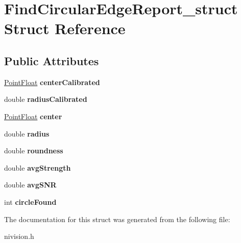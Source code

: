 \hypertarget{structFindCircularEdgeReport__struct}{
\section{FindCircularEdgeReport\_\-struct Struct Reference}
\label{structFindCircularEdgeReport__struct}
}
\subsection*{Public Attributes}
\begin{DoxyCompactItemize}
\item 
\hypertarget{structFindCircularEdgeReport__struct_afcd21848678630163917970da065044f}{
\hyperlink{structPointFloat__struct}{PointFloat} {\bfseries centerCalibrated}}
\label{structFindCircularEdgeReport__struct_afcd21848678630163917970da065044f}

\item 
\hypertarget{structFindCircularEdgeReport__struct_a06b1f9f481e32c75b83afce1d54f5763}{
double {\bfseries radiusCalibrated}}
\label{structFindCircularEdgeReport__struct_a06b1f9f481e32c75b83afce1d54f5763}

\item 
\hypertarget{structFindCircularEdgeReport__struct_a72e793670a1f32d13bfba3ac3c29a2e5}{
\hyperlink{structPointFloat__struct}{PointFloat} {\bfseries center}}
\label{structFindCircularEdgeReport__struct_a72e793670a1f32d13bfba3ac3c29a2e5}

\item 
\hypertarget{structFindCircularEdgeReport__struct_abc0523ac0e2c94b00c97cc9001f24bfd}{
double {\bfseries radius}}
\label{structFindCircularEdgeReport__struct_abc0523ac0e2c94b00c97cc9001f24bfd}

\item 
\hypertarget{structFindCircularEdgeReport__struct_ab1b5e3d6d07678b7d7a5faaa52014b65}{
double {\bfseries roundness}}
\label{structFindCircularEdgeReport__struct_ab1b5e3d6d07678b7d7a5faaa52014b65}

\item 
\hypertarget{structFindCircularEdgeReport__struct_a1907dd2f4ee93dd6d79a0dc87d227107}{
double {\bfseries avgStrength}}
\label{structFindCircularEdgeReport__struct_a1907dd2f4ee93dd6d79a0dc87d227107}

\item 
\hypertarget{structFindCircularEdgeReport__struct_a3bec766decf9b47d48f8ed274cb3665f}{
double {\bfseries avgSNR}}
\label{structFindCircularEdgeReport__struct_a3bec766decf9b47d48f8ed274cb3665f}

\item 
\hypertarget{structFindCircularEdgeReport__struct_a13abaa67fedfb679666f3e71b5d0d376}{
int {\bfseries circleFound}}
\label{structFindCircularEdgeReport__struct_a13abaa67fedfb679666f3e71b5d0d376}

\end{DoxyCompactItemize}


The documentation for this struct was generated from the following file:\begin{DoxyCompactItemize}
\item 
nivision.h\end{DoxyCompactItemize}
